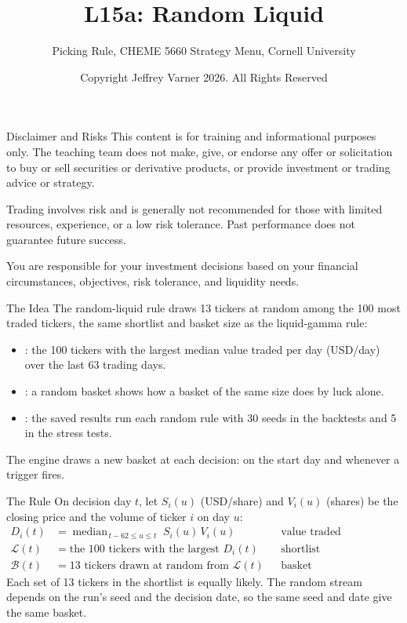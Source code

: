 \documentclass[aspectratio=169,11pt]{beamer}
\title{\texorpdfstring{{\vnheavy L15a}}{L15a}: Random Liquid}
\subtitle{Picking Rule, CHEME 5660 Strategy Menu, Cornell University}
\author{Copyright Jeffrey Varner 2026. All Rights Reserved}
\begin{document}
\vntitlepage

\begin{frame}{Disclaimer and Risks}
  \vspace{0.6em}
  \textbf{} This content is for training and informational
  purposes only. The teaching team does not make, give, or endorse any offer or
  solicitation to buy or sell securities or derivative products, or provide
  investment or trading advice or strategy.

  \vspace{1.1em}
  \textbf{} Trading involves risk and is generally not recommended for
  those with limited resources, experience, or a low risk tolerance. Past
  performance does not guarantee future success.

  \vspace{1.1em}
  \textbf{} You are responsible for your investment decisions
  based on your financial circumstances, objectives, risk tolerance, and
  liquidity needs.
\end{frame}

\begin{frame}{The Idea}
  \vspace{0.3em}
  The random-liquid rule draws 13 tickers at random among the 100 most traded tickers, the same shortlist and
  basket size as the liquid-gamma rule:
  \begin{itemize}\setlength{\itemsep}{0.5em}
    \item {}: the 100 tickers with the largest median value traded per day (USD/day) over the last 63 trading days.
    \item {}: a random basket shows how a basket of the same size does by luck alone.
    \item {}: the saved results run each random rule with 30 seeds in the backtests and 5 in the stress tests.
  \end{itemize}

  \vspace{0.5em}
  The engine draws a new basket at each decision: on the start day and whenever a trigger fires.
\end{frame}

\begin{frame}{The Rule}
  \vspace{0.3em}
  On decision day $t$, let $S_{i}(u)$ (USD/share) and $V_{i}(u)$ (shares) be the closing price and the volume
  of ticker $i$ on day $u$:
  {\setlength{\jot}{3pt}
  \begin{align*}
    D_{i}(t) &= \operatorname{median}_{\,t-62\leq u\leq t}\;S_{i}(u)\,V_{i}(u) && \text{value traded (USD/day)}\\
    \mathcal{L}(t) &= \text{the 100 tickers with the largest }D_{i}(t) && \text{shortlist}\\
    \mathcal{B}(t) &= \text{13 tickers drawn at random from }\mathcal{L}(t) && \text{basket}
  \end{align*}}%
  Each set of 13 tickers in the shortlist is equally likely. The random stream depends on the run's seed and the decision date, so the same seed and date give the same basket.
\end{frame}
\end{document}
